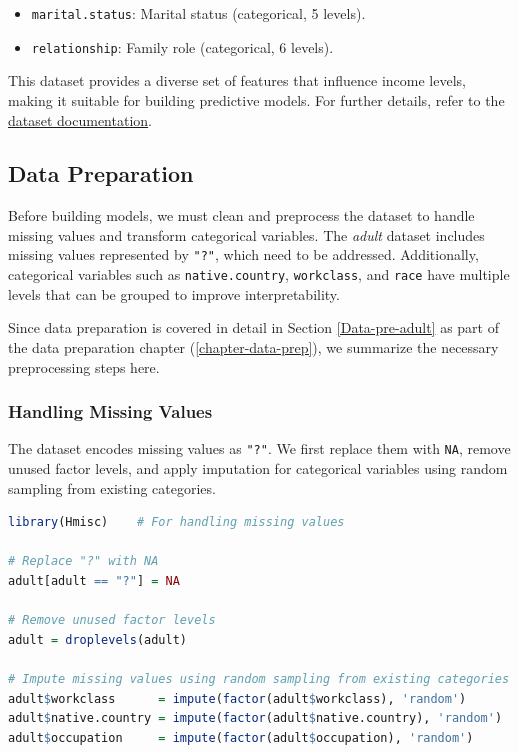 \documentclass[
]{book}
\newcommand{\passthrough}[1]{#1}
\providecommand{\tightlist}{%
  \setlength{\itemsep}{0pt}\setlength{\parskip}{0pt}}
\theoremstyle{definition}
\theoremstyle{definition}
\theoremstyle{definition}
\theoremstyle{definition}
\theoremstyle{remark}
\begin{document}
\begin{itemize}
  \begin{itemize}
  \tightlist
  \item
    \passthrough{\lstinline!marital.status!}: Marital status (categorical, 5 levels).\\
  \item
    \passthrough{\lstinline!relationship!}: Family role (categorical, 6 levels).
  \end{itemize}
\end{itemize}

This dataset provides a diverse set of features that influence income levels, making it suitable for building predictive models. For further details, refer to the \href{https://www.rdocumentation.org/packages/liver/versions/1.3/topics/adult}{dataset documentation}.

\subsection*{Data Preparation}\label{data-preparation-3}

Before building models, we must clean and preprocess the dataset to handle missing values and transform categorical variables. The \emph{adult} dataset includes missing values represented by \passthrough{\lstinline!"?"!}, which need to be addressed. Additionally, categorical variables such as \passthrough{\lstinline!native.country!}, \passthrough{\lstinline!workclass!}, and \passthrough{\lstinline!race!} have multiple levels that can be grouped to improve interpretability.

Since data preparation is covered in detail in Section \ref{Data-pre-adult} as part of the data preparation chapter (\ref{chapter-data-prep}), we summarize the necessary preprocessing steps here.

\subsubsection*{Handling Missing Values}\label{handling-missing-values}

The dataset encodes missing values as \passthrough{\lstinline!"?"!}. We first replace them with \passthrough{\lstinline!NA!}, remove unused factor levels, and apply imputation for categorical variables using random sampling from existing categories.

\begin{lstlisting}[language=R]
library(Hmisc)    # For handling missing values

# Replace "?" with NA
adult[adult == "?"] = NA

# Remove unused factor levels
adult = droplevels(adult)

# Impute missing values using random sampling from existing categories
adult$workclass      = impute(factor(adult$workclass), 'random')
adult$native.country = impute(factor(adult$native.country), 'random')
adult$occupation     = impute(factor(adult$occupation), 'random')
\end{lstlisting}
\end{document}
